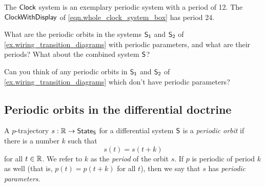 \documentclass[DynamicalBook]{subfiles}
\begin{document}
\begin{example}
  The $\mathsf{Clock}$ system is an exemplary periodic system with a period of 12.
  The $\mathsf{ClockWithDisplay}$ of \cref{eqn.whole_clock_system_box} has period 24.
\end{example}

\begin{exercise}\label{ex.wiring_transition_diagrams_periodic_orbits}
  What are the periodic orbits in the systems $\mathsf{S_1}$ and $\mathsf{S_2}$ of
  \cref{ex.wiring_transition_diagrams} with periodic parameters, and what are their periods? What about
  the combined system $\mathsf{S}$?
\end{exercise}

\begin{exercise}\label{ex.wiring_transition_diagrams_periodic_parameters}
  Can you think of any periodic orbits in $\mathsf{S_1}$ and $\mathsf{S_2}$ of
  \cref{ex.wiring_transition_diagrams} which
  don't have periodic parameters? 
\end{exercise}

\subsection{Periodic orbits in the differential doctrine}

\begin{definition}
A $p$-trajectory $s : \mathbb{R} \to \mathsf{State}_{\mathsf{S}}$ for a differential system $\mathsf{S}$ is
a \emph{periodic orbit} if there is a number $k$ such that
\[
s(t) = s(t + k)
\]
for all $t \in \mathbb{R}$. We refer to $k$ as the \emph{period} of the orbit $s$. If
$p$ is periodic of period $k$ as well (that is, $p(t) = p(t + k)$ for all $t$),
then we say that $s$ has \emph{periodic parameters}.
\end{definition}
\end{document}
